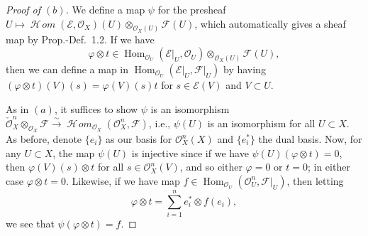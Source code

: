 \documentclass[12pt,letterpaper]{article}
\theoremstyle{definition}
\theoremstyle{remark}
\numberwithin{equation}{section}
\numberwithin{figure}{problem}
\DeclareMathOperator{\Hom}{Hom}
\newcommand{\EE}{\mathscr{E}}
\newcommand{\FF}{\mathscr{F}}
\newcommand{\OO}{\mathcal{O}}
\DeclareMathOperator{\HHom}{\mathscr{H}\!\mathit{om}}
\newcommand{\isoto}{\overset{\sim}{\to}}
\begin{document}
\begin{proof}[Proof of $(b)$]
  We define a map $\psi$ for the presheaf $U \mapsto \HHom(\EE,\OO_X)(U) \otimes_{\OO_X(U)} \FF(U)$, which automatically gives a sheaf map by Prop.-Def.~1.2. If we have
  \begin{equation*}
    \varphi \otimes t \in \Hom_{\OO_U}(\EE\vert_U,\OO_U) \otimes_{\OO_X(U)} \FF(U),
  \end{equation*}
  then we can define a map in $\Hom_{\OO_U}(\EE\vert_U,\FF\vert_U)$ by having $(\varphi \otimes t)(V)(s) = \varphi(V)(s)t$ for $s \in \EE(V)$ and $V \subset U$.
  \par As in $(a)$, it suffices to show $\psi$ is an isomorphism $\check{\OO}_X^n \otimes_{\OO_X} \FF \isoto \HHom_{\OO_X}(\OO_X^n,\FF)$, i.e., $\psi(U)$ is an isomorphism for all $U \subset X$. As before, denote $\{e_i\}$ as our basis for $\OO_X^n(X)$ and $\{e_i^*\}$ the dual basis. Now, for any $U \subset X$, the map $\psi(U)$ is injective since if we have $\psi(U)(\varphi \otimes t) = 0$, then $\varphi(V)(s) \otimes t$ for all $s \in \OO_X^n(V)$, and so either $\varphi = 0$ or $t = 0$; in either case $\varphi \otimes t = 0$. Likewise, if we have map $f \in \Hom_{\OO_U}(\OO_U^n,\FF\vert_U)$, then letting
  \begin{equation*}
    \varphi \otimes t = \sum_{i=1}^n e_i^* \otimes f(e_i),
  \end{equation*}
  we see that $\psi(\varphi \otimes t) = f$.
\end{proof}
\end{document}
